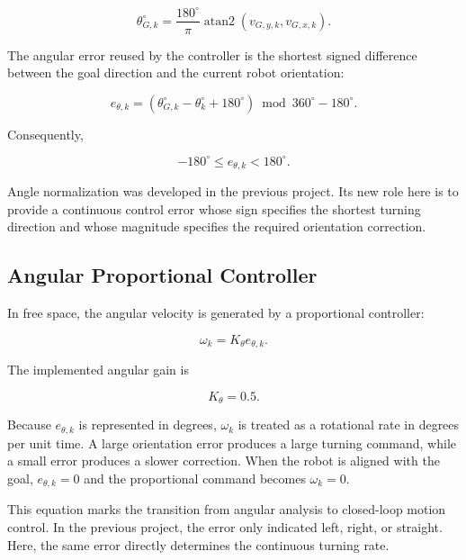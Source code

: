 \documentclass[10pt,twocolumn,a4paper]{article}
\begin{document}
\begin{equation}
    \theta_{G,k}^{\circ}
    =
    \frac{180^{\circ}}{\pi}
    \operatorname{atan2}(v_{G,y,k},v_{G,x,k}).
    \label{eq:goal_angle_deg}
\end{equation}

The angular error reused by the controller is the shortest signed
difference between the goal direction and the current robot orientation:

\begin{equation}
    e_{\theta,k}
    =
    \left(
    \theta_{G,k}^{\circ}-\theta_k^{\circ}+180^{\circ}
    \right)
    \bmod 360^{\circ}
    -180^{\circ}.
    \label{eq:angle_error_deg}
\end{equation}

Consequently,

\[
    -180^{\circ}
    \leq e_{\theta,k}
    <180^{\circ}.
\]

Angle normalization was developed in the previous project. Its new role
here is to provide a continuous control error whose sign specifies the
shortest turning direction and whose magnitude specifies the required
orientation correction.

\subsection{Angular Proportional Controller}

In free space, the angular velocity is generated by a proportional
controller:

\begin{equation}
    \omega_k = K_{\theta}e_{\theta,k}.
    \label{eq:p_angular_controller}
\end{equation}

The implemented angular gain is

\[
    K_{\theta}=0.5.
\]

Because $e_{\theta,k}$ is represented in degrees, $\omega_k$ is treated
as a rotational rate in degrees per unit time. A large orientation error
produces a large turning command, while a small error produces a slower
correction. When the robot is aligned with the goal,
$e_{\theta,k}=0$ and the proportional command becomes $\omega_k=0$.

This equation marks the transition from angular analysis to closed-loop
motion control. In the previous project, the error only indicated left,
right, or straight. Here, the same error directly determines the
continuous turning rate.
\end{document}

